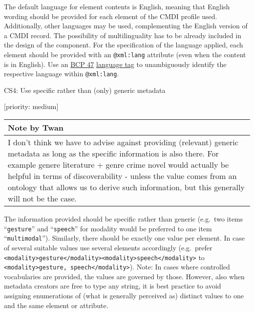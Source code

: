 The default language for element contents is English, meaning that
English wording should be provided for each element of the CMDI profile
used. Additionally, other languages may be used, complementing the
English version of a CMDI record. The possibility of multilinguality has
to be already included in the design of the component. For the
specification of the language applied, each element should be provided
with an \texttt{@xml:lang} attribute (even when the content is in
English). Use an \href{https://tools.ietf.org/rfc/bcp/bcp47.txt}{BCP 47}
\href{https://tools.ietf.org/rfc/bcp/bcp47.txt}{language tag} to
unambiguously identify the respective language within
\texttt{@xml:lang}.

CS4: Use specific rather than (only) generic metadata

{[}priority: medium{]}

\begin{longtable}[c]{@{}l@{}}
\toprule
\begin{minipage}[b]{0.07\columnwidth}\raggedright\strut
Note by Twan
\strut\end{minipage}\tabularnewline
\midrule
\endhead
\begin{minipage}[t]{0.07\columnwidth}\raggedright\strut
I don't think we have to advise against providing (relevant) generic
metadata as long as the specific information is also there. For example
genere literature + genre crime novel would actually be helpful in terms
of discoverability - unless the value comes from an ontology that allows
us to derive such information, but this generally will not be the case.
\strut\end{minipage}\tabularnewline
\bottomrule
\end{longtable}

The information provided should be specific rather than generic
(e.g.~two items ``\texttt{gesture}'' and ``\texttt{speech}'' for
modality would be preferred to one item ``\texttt{multimodal}'').
Similarly, there should be exactly one value per element. In case of
several suitable values use several elements accordingly (e.g.~prefer
\texttt{\textless{}modality\textgreater{}gesture\textless{}/modality\textgreater{}\textless{}modality\textgreater{}speech\textless{}/modality\textgreater{}}
to
\texttt{\textless{}modality\textgreater{}gesture,\ speech\textless{}/modality\textgreater{}}).
Note: In cases where controlled vocabularies are provided, the values
are governed by those. However, also when metadata creators are free to
type any string, it is best practice to avoid assigning enumerations of
(what is generally perceived as) distinct values to one and the same
element or attribute.

